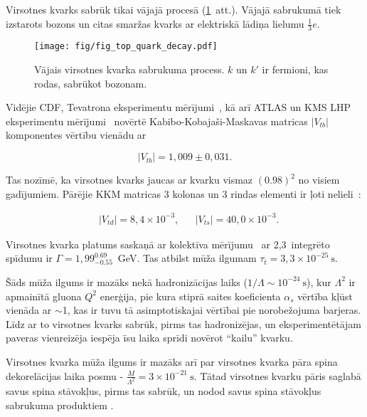 Virsotnes kvarks sabrūk tikai vājajā procesā (\ref{fig:quark_decay}~att.). Vājajā sabrukumā tiek izstarots \PW bozons un citas \gls{smaržas} kvarks ar elektriskā lādiņa lielumu $\frac{1}{3}e$. 

\begin{figure}[H]
  \centering
  \texttt{[image: fig/fig\_top\_quark\_decay.pdf]}
  \caption{Vājais virsotnes kvarka \cPqt sabrukuma process. $k$ un $k'$ ir fermioni, kas rodas, sabrūkot \PW bozonam.}
  \label{fig:quark_decay}
\end{figure}

Vidējie CDF, \DZERO Tevatrona eksperimentu mērījumi~\cite{Aaltonen:2015cra}, kā arī ATLAS un KMS LHP eksperimentu mērījumi~\cite{twiki:tt_curve_toplhcwg_sep18} novērtē Kabibo-Kobajaši-Maskavas matricas $|V_{tb}|$ komponentes vērtību vienādu ar

\begin{equation}
  |V_{tb}|=1,009\pm0,031.
\end{equation}

Tas nozīmē, ka virsotnes kvarks jaucas ar \cPqb kvarku vismaz $(0.98)^{2}$ no visiem gadījumiem. Pārējie KKM matricas 3 kolonas un 3 rindas elementi ir ļoti nelieli~\cite{Patrignani:2016xqp}:

\begin{align}
  & |V_{td}|=8,4\times10^{-3}, && |V_{ts}|=40,0\times10^{-3}.
\end{align}

Virsotnes kvarka platums saskaņā ar \DZERO kolektīva mērījumu~\cite{Abazov:2010tm} ar 2,3~\fbinv integrēto spīdumu ir $\Gamma=1,99^{0.69}_{-0.55}$~GeV. Tas atbilst mūža ilgumam $\tau_{t}=3,3\times10^{-25}~\text{s}$.

Šāds mūža ilgums ir mazāks nekā hadronizācijas laiks ($1/\Lambda\sim10^{-24}~\text{s}$), kur $\Lambda^{2}$ ir apmainītā gluona $Q^{2}$ enerģija, pie kura stiprā saites koeficienta $\alpha_{s}$ vērtība kļūst vienāda ar $\sim$1, kas ir tuvu tā asimptotiskajai vērtībai pie \gls{norobežojuma barjeras}. Līdz ar to virsotnes kvarks sabrūk, pirms tas hadronizējas, un eksperimentētājam paveras vienreizēja iespēja īsu laika sprīdi novērot ``kailu'' kvarku.

Virsotnes kvarka mūža ilgums ir mazāks arī par virsotnes kvarka pāra spina dekorelācijas laika posmu - $\frac{M}{{\Lambda^{2}}}=3\times10^{-21}~\text{s}$. Tātad virsotnes kvarku pāris saglabā savus spina stāvokļus, pirms tas sabrūk, un nodod savus spina stāvokļus sabrukuma produktiem \cite{Cristinziani:2016vif}.

